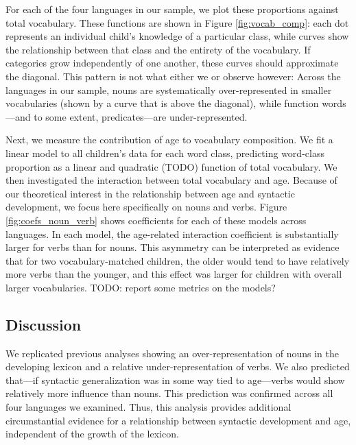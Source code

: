 \documentclass[10pt,letterpaper]{article}
\begin{document}
For each of the four languages in our sample, we plot these proportions against total vocabulary. These functions are shown in Figure \ref{fig:vocab_comp}: each dot represents an individual child's knowledge of a particular class, while curves show the relationship between that class and the entirety of the vocabulary. If categories grow independently of one another, these curves should approximate the diagonal. This pattern is not what either we or \citeauthor{bates1994} observe however: Across the languages in our sample, nouns are systematically over-represented in smaller vocabularies (shown by a curve that is above the diagonal), while function words---and to some extent, predicates---are under-represented. 

Next, we measure the contribution of age to vocabulary composition. We fit a linear model to all children's data for each word class, predicting word-class proportion as a linear and quadratic (TODO) function of total vocabulary. We then investigated the interaction between total vocabulary and age. Because of our theoretical interest in the relationship between age and syntactic development, we focus here specifically on nouns and verbs. Figure \ref{fig:coefs_noun_verb} shows coefficients for each of these models across languages. In each model, the age-related interaction coefficient is substantially larger for verbs than for nouns. This asymmetry can be interpreted as evidence that for two vocabulary-matched children, the older would tend to have relatively more verbs than the younger, and this effect was larger for children with overall larger vocabularies. TODO: report some metrics on the models?

\subsection{Discussion}

We replicated previous analyses showing an over-representation of nouns in the developing lexicon and a relative under-representation of verbs. We also predicted that---if syntactic generalization was in some way tied to age---verbs would show relatively more influence than nouns. This prediction was confirmed across all four languages we examined. Thus, this analysis provides additional circumstantial evidence for a relationship between syntactic development and age, independent of the growth of the lexicon.
\end{document}
